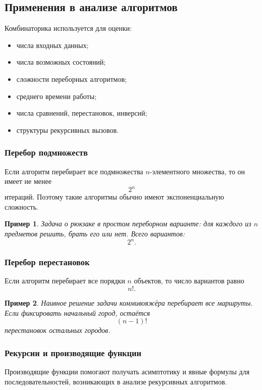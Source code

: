 \documentclass[12pt,a4paper]{article}
\newtheorem{example}{Пример}
\begin{document}
\subsection{Применения в анализе алгоритмов}

Комбинаторика используется для оценки:
\begin{itemize}
    \item числа входных данных;
    \item числа возможных состояний;
    \item сложности переборных алгоритмов;
    \item среднего времени работы;
    \item числа сравнений, перестановок, инверсий;
    \item структуры рекурсивных вызовов.
\end{itemize}

\subsubsection{Перебор подмножеств}

Если алгоритм перебирает все подмножества $n$-элементного множества, то он имеет не менее
\[
2^n
\]
итераций. Поэтому такие алгоритмы обычно имеют экспоненциальную сложность.

\begin{example}
Задача о рюкзаке в простом переборном варианте: для каждого из $n$ предметов решить, брать его или нет. Всего вариантов:
\[
2^n.
\]
\end{example}

\subsubsection{Перебор перестановок}

Если алгоритм перебирает все порядки $n$ объектов, то число вариантов равно
\[
n!.
\]

\begin{example}
Наивное решение задачи коммивояжёра перебирает все маршруты. Если фиксировать начальный город, остаётся
\[
(n-1)!
\]
перестановок остальных городов.
\end{example}

\subsubsection{Рекурсии и производящие функции}

Производящие функции помогают получать асимптотику и явные формулы для последовательностей, возникающих в анализе рекурсивных алгоритмов.
\end{document}
